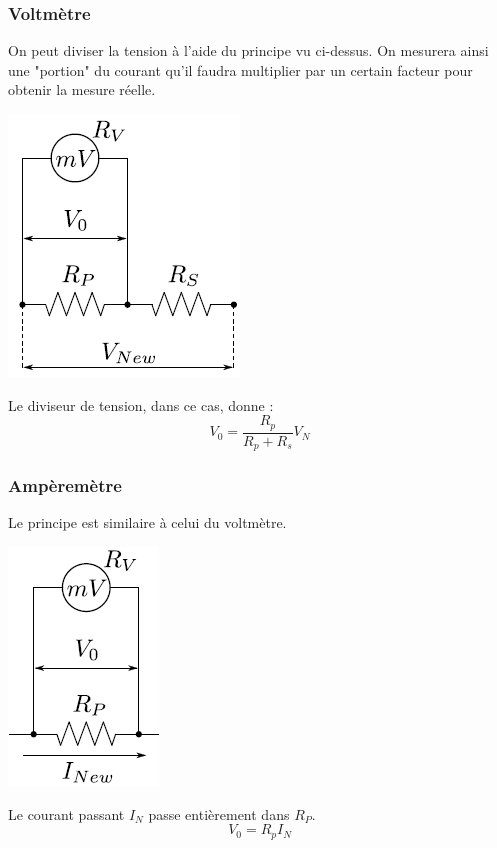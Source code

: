 \documentclass	[11pt, a4paper, openany]{book}
\begin{document}
		\subsubsection*{Voltmètre}
		On peut diviser la tension à l'aide du principe vu ci-dessus. On mesurera ainsi une "portion" du courant qu'il faudra multiplier par un certain facteur pour obtenir la mesure réelle.
		\begin{center}
			\includegraphics[scale=0.5]{labo/image11.png}
		\end{center}
		Le diviseur de tension, dans ce cas, donne :
		\begin{equation}
			V_0 = \frac{R_p}{R_p + R_s}V_N
		\end{equation}
		\subsubsection*{Ampèremètre}
		Le principe est similaire à celui du voltmètre.
		\begin{center}
			\includegraphics[scale=0.5]{labo/image12.png}
		\end{center}
		Le courant passant $I_N$ passe entièrement dans $R_P$.
		\begin{equation}
			V_0 = R_pI_N
		\end{equation}
		
\end{document}
